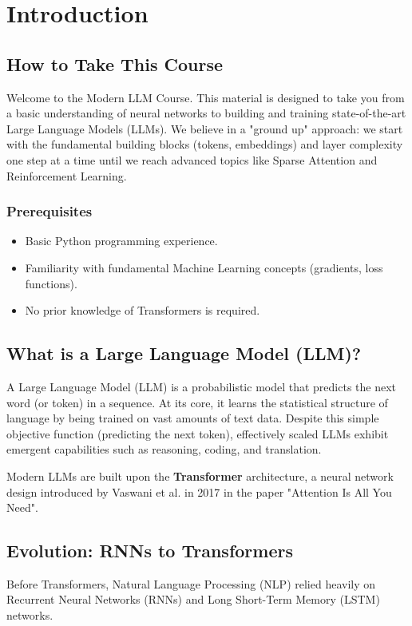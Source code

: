 \chapter{Introduction}

\section{How to Take This Course}
Welcome to the Modern LLM Course. This material is designed to take you from a basic understanding of neural networks to building and training state-of-the-art Large Language Models (LLMs).
We believe in a "ground up" approach: we start with the fundamental building blocks (tokens, embeddings) and layer complexity one step at a time until we reach advanced topics like Sparse Attention and Reinforcement Learning.

\subsection*{Prerequisites}
\begin{itemize}
    \item Basic Python programming experience.
    \item Familiarity with fundamental Machine Learning concepts (gradients, loss functions).
    \item No prior knowledge of Transformers is required.
\end{itemize}

\section{What is a Large Language Model (LLM)?}
A Large Language Model (LLM) is a probabilistic model that predicts the next word (or token) in a sequence. At its core, it learns the statistical structure of language by being trained on vast amounts of text data. Despite this simple objective function (predicting the next token), effectively scaled LLMs exhibit emergent capabilities such as reasoning, coding, and translation.

Modern LLMs are built upon the \textbf{Transformer} architecture, a neural network design introduced by Vaswani et al. in 2017 in the paper "Attention Is All You Need".

\section{Evolution: RNNs to Transformers}
Before Transformers, Natural Language Processing (NLP) relied heavily on Recurrent Neural Networks (RNNs) and Long Short-Term Memory (LSTM) networks.

